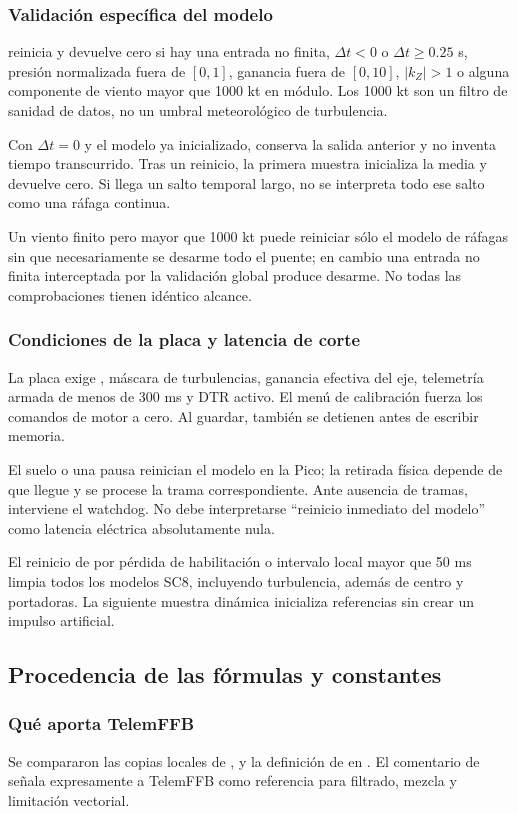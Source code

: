 \subsubsection{Validación específica del modelo}
 reinicia y devuelve cero si hay una entrada no finita, $\Delta t<0$ o $\Delta t\ge0.25$ s, presión normalizada fuera de $[0,1]$, ganancia fuera de $[0,10]$, $|k_Z|>1$ o alguna componente de viento mayor que 1000 kt en módulo. Los 1000 kt son un filtro de sanidad de datos, no un umbral meteorológico de turbulencia.

Con $\Delta t=0$ y el modelo ya inicializado, conserva la salida anterior y no inventa tiempo transcurrido. Tras un reinicio, la primera muestra inicializa la media y devuelve cero. Si llega un salto temporal largo, no se interpreta todo ese salto como una ráfaga continua.

Un viento finito pero mayor que 1000 kt puede reiniciar sólo el modelo de ráfagas sin que necesariamente se desarme todo el puente; en cambio una entrada no finita interceptada por la validación global produce desarme. No todas las comprobaciones tienen idéntico alcance.

\subsubsection{Condiciones de la placa y latencia de corte}
La placa exige , máscara de turbulencias, ganancia efectiva del eje, telemetría armada de menos de 300 ms y DTR activo. El menú de calibración fuerza los comandos de motor a cero. Al guardar, también se detienen antes de escribir memoria.

El suelo o una pausa reinician el modelo en la Pico; la retirada física depende de que llegue y se procese la trama correspondiente. Ante ausencia de tramas, interviene el watchdog. No debe interpretarse ``reinicio inmediato del modelo'' como latencia eléctrica absolutamente nula.

El reinicio de  por pérdida de habilitación o intervalo local mayor que 50 ms limpia todos los modelos SC8, incluyendo turbulencia, además de centro y portadoras. La siguiente muestra dinámica inicializa referencias sin crear un impulso artificial.

\subsection{Procedencia de las fórmulas y constantes}
\subsubsection{Qué aporta TelemFFB}
Se compararon las copias locales de ,  y la definición de  en . El comentario de  señala expresamente a TelemFFB como referencia para filtrado, mezcla y limitación vectorial.

